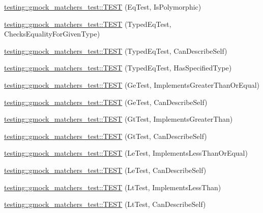 \begin{DoxyCompactItemize}
\item 
\hyperlink{namespacetesting_1_1gmock__matchers__test_ac3ea755ba2a8bb480cee70aa37ccafc2}{testing\+::gmock\+\_\+matchers\+\_\+test\+::\+T\+E\+ST} (Eq\+Test, Is\+Polymorphic)
\item 
\hyperlink{namespacetesting_1_1gmock__matchers__test_a3e8d6cc259c1410a85572bc773bb21b9}{testing\+::gmock\+\_\+matchers\+\_\+test\+::\+T\+E\+ST} (Typed\+Eq\+Test, Checks\+Equality\+For\+Given\+Type)
\item 
\hyperlink{namespacetesting_1_1gmock__matchers__test_a9baf261536023ac58ed65cdafcaf1602}{testing\+::gmock\+\_\+matchers\+\_\+test\+::\+T\+E\+ST} (Typed\+Eq\+Test, Can\+Describe\+Self)
\item 
\hyperlink{namespacetesting_1_1gmock__matchers__test_ae0255a5de2ef537512379c3f8ff9e34f}{testing\+::gmock\+\_\+matchers\+\_\+test\+::\+T\+E\+ST} (Typed\+Eq\+Test, Has\+Specified\+Type)
\item 
\hyperlink{namespacetesting_1_1gmock__matchers__test_a7d73fdbbee36ccf241ec6e328175655b}{testing\+::gmock\+\_\+matchers\+\_\+test\+::\+T\+E\+ST} (Ge\+Test, Implements\+Greater\+Than\+Or\+Equal)
\item 
\hyperlink{namespacetesting_1_1gmock__matchers__test_a2718c8d5456b62ab7b060b2723939a72}{testing\+::gmock\+\_\+matchers\+\_\+test\+::\+T\+E\+ST} (Ge\+Test, Can\+Describe\+Self)
\item 
\hyperlink{namespacetesting_1_1gmock__matchers__test_a87a9ac189a12e0b85964f03b3b9998b1}{testing\+::gmock\+\_\+matchers\+\_\+test\+::\+T\+E\+ST} (Gt\+Test, Implements\+Greater\+Than)
\item 
\hyperlink{namespacetesting_1_1gmock__matchers__test_a2981bbdbf9cbd8864a6dde4ff4b06050}{testing\+::gmock\+\_\+matchers\+\_\+test\+::\+T\+E\+ST} (Gt\+Test, Can\+Describe\+Self)
\item 
\hyperlink{namespacetesting_1_1gmock__matchers__test_af0cd1cfc3ff1272bfe06f31c5eb3ab8b}{testing\+::gmock\+\_\+matchers\+\_\+test\+::\+T\+E\+ST} (Le\+Test, Implements\+Less\+Than\+Or\+Equal)
\item 
\hyperlink{namespacetesting_1_1gmock__matchers__test_a463bc4f6cdca489c05ad691e1254e2f3}{testing\+::gmock\+\_\+matchers\+\_\+test\+::\+T\+E\+ST} (Le\+Test, Can\+Describe\+Self)
\item 
\hyperlink{namespacetesting_1_1gmock__matchers__test_a9f332401730e637d5c3923924dc339e3}{testing\+::gmock\+\_\+matchers\+\_\+test\+::\+T\+E\+ST} (Lt\+Test, Implements\+Less\+Than)
\item 
\hyperlink{namespacetesting_1_1gmock__matchers__test_ae29bb32c74970fc22e7ac5d86e7e6c26}{testing\+::gmock\+\_\+matchers\+\_\+test\+::\+T\+E\+ST} (Lt\+Test, Can\+Describe\+Self)

\end{DoxyCompactItemize}
